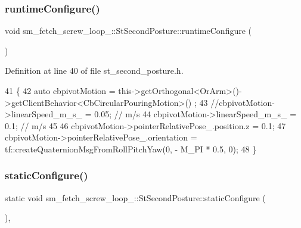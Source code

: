 \subsubsection{\texorpdfstring{runtime\+Configure()}{runtimeConfigure()}}
{\footnotesize\ttfamily void sm\+\_\+fetch\+\_\+screw\+\_\+loop\+\_\+::\+St\+Second\+Posture\+::runtime\+Configure (\begin{DoxyParamCaption}{ }\end{DoxyParamCaption})\hspace{0.3cm}{\ttfamily [inline]}}



Definition at line 40 of file st\+\_\+second\+\_\+posture.\+h.


\begin{DoxyCode}
41         \{
42             \textcolor{keyword}{auto} cbpivotMotion = this->getOrthogonal<OrArm>()->getClientBehavior<CbCircularPouringMotion>()
      ;
43             \textcolor{comment}{//cbpivotMotion->linearSpeed\_m\_s\_ = 0.05; // m/s}
44             cbpivotMotion->linearSpeed\_m\_s\_ = 0.1; \textcolor{comment}{// m/s}
45 
46             cbpivotMotion->pointerRelativePose\_.position.z = 0.1;
47             cbpivotMotion->pointerRelativePose\_.orientation = tf::createQuaternionMsgFromRollPitchYaw(0, -
      M\_PI * 0.5, 0);
48         \}
\end{DoxyCode}
\mbox{\label{structsm__fetch__screw__loop__1_1_1StSecondPosture_aacd995a1cea5a1a6ded4b3ca8cb36c90}} 
\subsubsection{\texorpdfstring{static\+Configure()}{staticConfigure()}}
{\footnotesize\ttfamily static void sm\+\_\+fetch\+\_\+screw\+\_\+loop\+\_\+::\+St\+Second\+Posture\+::static\+Configure (\begin{DoxyParamCaption}{ }\end{DoxyParamCaption})\hspace{0.3cm}{\ttfamily [inline]}, {\ttfamily [static]}}



